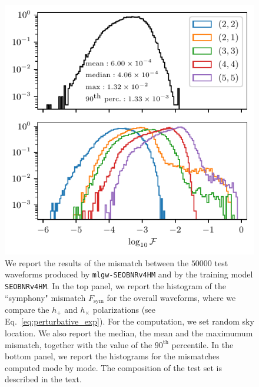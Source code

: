 \documentclass[twocolumn,showpacs,preprintnumbers,nofootinbib,prd,
superscriptaddress,10pt]{revtex4-2}
\begin{document}
\begin{figure}[t]
	\centering
	\includegraphics[scale = 1]{accuracy}
	\caption{We report the results of the mismatch between the $50000$ test waveforms produced by \texttt{mlgw-SEOBNRv4HM} and by the training model \texttt{SEOBNRv4HM}.
	In the top panel, we report the histogram of the ``symphony" mismatch $F_\text{sym}$ for the overall waveforms, where we compare the $h_+$ and $h_\times$ polarizations (see Eq.~\eqref{eq:perturbative_exp}). For the computation, we set random sky location. We also report the median, the mean and the maximumum mismatch, together with the value of the $90^\text{th}$ percentile.
	In the bottom panel, we report the histograms for the mismatches computed mode by mode.
	The composition of the test set is described in the text.
	}
	\label{fig:accuracy_hist}
\end{figure}
\end{document}
